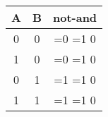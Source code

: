 \documentclass{article}
\begin{document}
\vspace*{\fill}\vspace{-5ex}

\newcommand{\nand}[2]{
\ifnum #1=#2
    \ifnum#1=1 
        0 
    \else 
        1 
    \fi
\else 
    1 
\fi
}
 
\begin{tabular}{cc|c}
A & B & not-and\\\hline
0 & 0 & \nand{0}{0}\\
1 & 0 & \nand{1}{0}\\
0 & 1 & \nand{0}{1}\\
1 & 1 & \nand{1}{1}\\
\end{tabular}
\vspace*{\fill}
\end{document}
